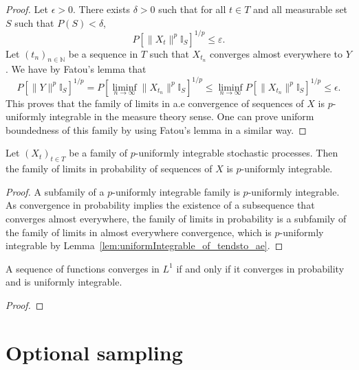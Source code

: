 \begin{proof}
  \leanok
  Let $\epsilon > 0$. There exists $\delta > 0$ such that for all $t\in T$ and all measurable set $S$ such that $P(S)<\delta$,
  \[P[\|X_t\|^p\mathbb{I}_S]^{1/p}\le \varepsilon.\]
  Let $(t_n)_{n \in \mathbb{N}}$ be a sequence in $T$ such that $X_{t_n}$ converges almost everywhere to $Y$. We have by Fatou's lemma that
  \[P[\|Y\|^p \mathbb{I}_{S}]^{1/p} = P[\liminf_{n \to \infty} \|X_{t_{n}}\|^p \mathbb{I}_{S}]^{1/p} \le \liminf_{n \to \infty} P[\|X_{t_{n}}\|^p \mathbb{I}_{S}]^{1/p} \le \epsilon.\]
  This proves that the family of limits in a.e convergence of sequences of $X$ is $p$-uniformly integrable in the measure theory sense. One can prove uniform boundedness of this family by using Fatou's lemma in a similar way.
\end{proof}

\begin{lemma}\label{lem:uniformIntegrable_of_tendstoInMeasure}
  \leanok
  Let $(X_t)_{t \in T}$ be a family of $p$-uniformly integrable stochastic processes. Then the family of limits in probability of sequences of $X$ is $p$-uniformly integrable.
\end{lemma}

\begin{proof}
  \leanok
  A subfamily of a $p$-uniformly integrable family is $p$-uniformly integrable. As convergence in probability implies the existence of a subsequence that converges almost everywhere, the family of limits in probability is a subfamily of the family of limits in almost everywhere convergence, which is $p$-uniformly integrable by Lemma~\ref{lem:uniformIntegrable_of_tendsto_ae}.
\end{proof}

\begin{lemma}\label{lem:vitali}
  \mathlibok
  A sequence of functions converges in $L^1$ if and only if it converges in probability and is uniformly integrable.
\end{lemma}

\begin{proof}\leanok

\end{proof}

\section{Optional sampling}


